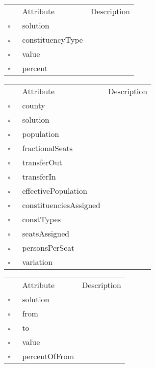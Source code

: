 \begin{table}
\caption{SolConstType  }

\begin{longtable}{llp{8cm}}
& Attribute & Description \\
$\square$\ & solution &  \\
$\square$\ & constituencyType &  \\
$\square$\ & value &  \\
$\square$\ & percent &  \\
\end{longtable}
\label{attr:SolConstType}
\end{table}

\begin{table}
\caption{SolCounty  }

\begin{longtable}{llp{8cm}}
& Attribute & Description \\
$\square$\ & county &  \\
$\square$\ & solution &  \\
$\square$\ & population &  \\
$\square$\ & fractionalSeats &  \\
$\square$\ & transferOut &  \\
$\square$\ & transferIn &  \\
$\square$\ & effectivePopulation &  \\
$\square$\ & constituenciesAssigned &  \\
$\square$\ & constTypes &  \\
$\square$\ & seatsAssigned &  \\
$\square$\ & personsPerSeat &  \\
$\square$\ & variation &  \\
\end{longtable}
\label{attr:SolCounty}
\end{table}

\begin{table}
\caption{SolTransfer  }

\begin{longtable}{llp{8cm}}
& Attribute & Description \\
$\square$\ & solution &  \\
$\square$\ & from &  \\
$\square$\ & to &  \\
$\square$\ & value &  \\
$\square$\ & percentOfFrom &  \\
\end{longtable}
\label{attr:SolTransfer}
\end{table}


